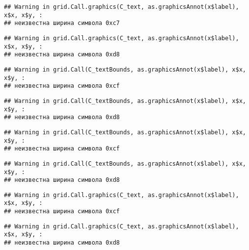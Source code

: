 \documentclass[
]{article}
\begin{document}
\begin{verbatim}
## Warning in grid.Call.graphics(C_text, as.graphicsAnnot(x$label), x$x, x$y, :
## неизвестна ширина символа 0xc7
\end{verbatim}

\begin{verbatim}
## Warning in grid.Call.graphics(C_text, as.graphicsAnnot(x$label), x$x, x$y, :
## неизвестна ширина символа 0xd8
\end{verbatim}

\begin{verbatim}
## Warning in grid.Call(C_textBounds, as.graphicsAnnot(x$label), x$x, x$y, :
## неизвестна ширина символа 0xcf
\end{verbatim}

\begin{verbatim}
## Warning in grid.Call(C_textBounds, as.graphicsAnnot(x$label), x$x, x$y, :
## неизвестна ширина символа 0xd8
\end{verbatim}

\begin{verbatim}
## Warning in grid.Call(C_textBounds, as.graphicsAnnot(x$label), x$x, x$y, :
## неизвестна ширина символа 0xcf
\end{verbatim}

\begin{verbatim}
## Warning in grid.Call(C_textBounds, as.graphicsAnnot(x$label), x$x, x$y, :
## неизвестна ширина символа 0xd8
\end{verbatim}

\begin{verbatim}
## Warning in grid.Call.graphics(C_text, as.graphicsAnnot(x$label), x$x, x$y, :
## неизвестна ширина символа 0xcf
\end{verbatim}

\begin{verbatim}
## Warning in grid.Call.graphics(C_text, as.graphicsAnnot(x$label), x$x, x$y, :
## неизвестна ширина символа 0xd8
\end{verbatim}
\end{document}
